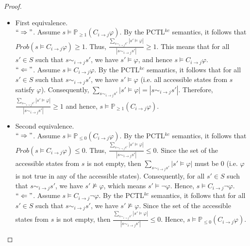 \begin{proof}\hspace{-0.9cm}


\begin{itemize}
\item First equivalence. ~\\
    $``\Rightarrow"$. Assume $s\models \mathbb{P}_{\geq1} (C_{i \rightarrow j}\varphi)$.
    By the PCTL$^{kc}$ semantics, it follows that $Prob(s\models C_{i\rightarrow j}\varphi)\geq1$.
    Thus,  $\frac{\sum_{s\sim_{i \rightarrow j}s'}|s'\models \varphi| }{|s\sim_{i \rightarrow j}s'|}\geq1$.
    This means that for all $s'\in S$ such that $s\sim_{i \rightarrow j}s'$, we have
    $s'\models \varphi$, and hence $s \models C_{i\rightarrow j}\varphi$. \\
    $``\Leftarrow"$. Assume $s\models C_{i \rightarrow j}\varphi$. By the
    PCTL$^{kc}$ semantics, it follows that for all $s'\in S$ such that $s\sim_{i \rightarrow j}s'$,
    we have $s'\models \varphi$ (i.e. all accessible states from $s$ satisfy $\varphi$).
    Consequently, $\sum_{s\sim_{i \rightarrow j}s'}|s'\models \varphi| = |s\sim_{i \rightarrow j}s'|$.
    Therefore, $\frac{\sum_{s\sim_{i \rightarrow j}s'}|s'\models \varphi| }{|s\sim_{i \rightarrow j}s'|}\geq1$
    and hence, $s\models \mathbb{P}_{\geq1} (C_{i \rightarrow j}\varphi)$.

\item Second equivalence. ~\\
    $``\Rightarrow"$. Assume $s\models \mathbb{P}_{\leq0} (C_{i \rightarrow j}\varphi)$.
    By the PCTL$^{kc}$ semantics, it follows that $Prob(s\models C_{i\rightarrow j}\varphi)\leq0$.
    Thus, $\frac{\sum_{s\sim_{i \rightarrow j}s'}|s'\models \varphi|}{|s\sim_{i \rightarrow j}s'|}\leq0$.
    Since the set of the accessible states from $s$ is not empty, then $\sum_{s\sim_{i \rightarrow j}s'}|s'\models \varphi|$
    must be 0 (i.e. $\varphi$ is not true in any of the accessible states). Consequently, for all $s'\in S$
    such that $s\sim_{i \rightarrow j}s'$, we have $s'\nvDash \varphi$, which means $s'\vDash \neg \varphi$.
     Hence, $s\models C_{i\rightarrow j}\neg \varphi$.~\\
%
    $``\Leftarrow"$. Assume $s\models C_{i \rightarrow j}\neg \varphi$. By the PCTL$^{kc}$ semantics,
    it follows that for all $s'\in S$ such that
    $s\sim_{i \rightarrow j}s'$, we have $s'\nvDash \varphi$. Since the set of the accessible states from $s$ is not empty,
    then $\frac{\sum_{s\sim_{i \rightarrow j}s'}|s'\models \varphi| }{|s\sim_{i \rightarrow j}s'|}\leq0$.
    Hence, $s\models \mathbb{P}_{\leq0} (C_{i \rightarrow j}\varphi)$.


\end{itemize}
\end{proof}
